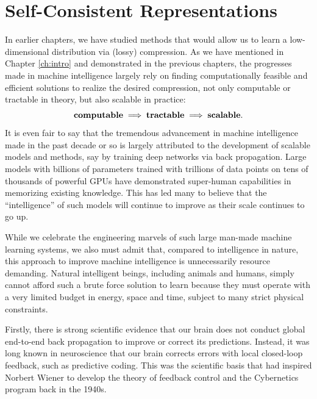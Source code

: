 \documentclass[../../book-main.tex]{subfiles}
\begin{document}

\section{Self-Consistent Representations}
\label{sec:self-consistency}

In earlier chapters, we have studied methods that would allow us to learn a low-dimensional distribution via (lossy) compression. As we have mentioned in Chapter \ref{ch:intro} and demonstrated in the previous chapters, the progresses made in machine intelligence largely rely on finding computationally feasible and efficient solutions to realize the desired compression, not only computable or tractable in theory, but also scalable in practice:
\begin{equation}
\mbox{\textbf{computable}} \;
   \Longrightarrow \; \mbox{\textbf{tractable}} \; \Longrightarrow \; 
   \mbox{\textbf{scalable}}.
\end{equation}
It is even fair to say that the tremendous advancement in machine intelligence made in the past decade or so is largely attributed to the development of scalable models and methods, say by training deep networks via back propagation. Large models with billions of parameters trained with trillions of data points on tens of thousands of powerful GPUs have demonstrated super-human capabilities in memorizing existing knowledge. This has led many to believe that the ``intelligence'' of such models will continue to improve as their scale continues to go up. 

While we celebrate the engineering marvels of such large man-made machine learning  systems, we also must admit that, compared to intelligence in nature, this approach to improve machine intelligence is unnecessarily resource demanding. Natural intelligent beings, including animals and humans, simply cannot afford such a brute force solution to learn because they must operate with a very limited budget in energy, space and time, subject to many strict physical constraints. 

Firstly, there is strong scientific evidence that our brain does not conduct global end-to-end back propagation to improve or correct its predictions. Instead, it was long known in neuroscience that our brain corrects errors with local closed-loop feedback, such as predictive coding. This was the scientific basis that had inspired Norbert Wiener to develop the theory of feedback control and the Cybernetics program back in the 1940s. 
\end{document}
